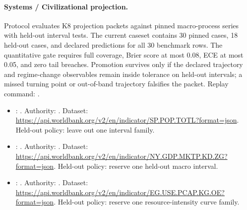 \paragraph{Systems / Civilizational projection.}
Protocol 
evaluates K8 projection packets against pinned macro-process series with
held-out interval tests. The current caseset contains 30 pinned cases, 18
held-out cases, and declared predictions for all 30 benchmark rows. The
quantitative gate requires full coverage, Brier score at most 0.08, ECE at
most 0.05, and zero tail breaches. Promotion survives only if the declared
trajectory and regime-change observables remain inside tolerance on held-out
intervals; a missed turning point or out-of-band trajectory falsifies the
packet. Replay command:
.
\begin{itemize}[leftmargin=1.5em,nosep]
\item {}: . Authority: . Dataset: \url{https://api.worldbank.org/v2/en/indicator/SP.POP.TOTL?format=json}. Held-out policy: leave out one interval family.
\item {}: . Authority: . Dataset: \url{https://api.worldbank.org/v2/en/indicator/NY.GDP.MKTP.KD.ZG?format=json}. Held-out policy: reserve one held-out macro interval.
\item {}: . Authority: . Dataset: \url{https://api.worldbank.org/v2/en/indicator/EG.USE.PCAP.KG.OE?format=json}. Held-out policy: reserve one resource-intensity curve family.
\end{itemize}

\endgroup
